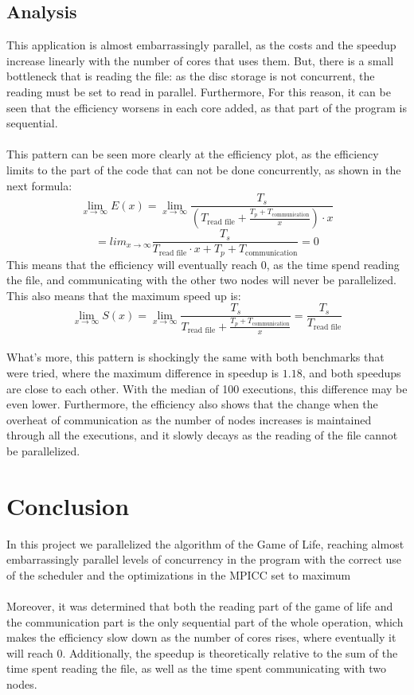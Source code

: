 \documentclass[11pt, a4paper]{article}
\begin{document}
	\subsection{Analysis}
	This application is almost embarrassingly parallel, as the costs and the speedup increase linearly with the number of cores that uses them. But, there is a small bottleneck that is reading the file: as the disc storage is not concurrent, the reading must be set to read in parallel. Furthermore, For this reason, it can be seen that the efficiency worsens in each core added, as that part of the program is sequential.\\
\\
This pattern can be seen more clearly at the efficiency plot, as the efficiency limits to the part of the code that can not be done concurrently, as shown in the next formula:
\[ \lim_{x \to \infty} E(x) = \lim_{x \to \infty} \frac{T_s} {(T_{\text{read file}} +  \frac{T_p + T_\text{communication}} x ) \cdot x} \]
\[= lim_{x \to \infty}\frac{T_s}{T_\text{read file} \cdot x + T_p + T_{\text{communication}}} = 0\]
This means that the efficiency will eventually reach 0, as the time spend reading the file, and communicating with the other two nodes will never be parallelized. This also means that the maximum speed up is:
\[ \lim_{x \to \infty} S(x) = \lim_{x \to \infty} \frac{T_s}{T_{\text{read file}} + \frac{T_p + T_\text{communication}}x} = \frac{T_s}{T_\text{read file}}\]
\\
What's more, this pattern is shockingly the same with both benchmarks that were tried, where the maximum difference in speedup is $1.18$, and both speedups are close to each other. With the median of 100 executions, this difference may be even lower. Furthermore, the efficiency also shows that the change when the overheat of communication as the number of nodes increases is maintained through all the executions, and it slowly decays as the reading of the file cannot be parallelized. 
	\section{Conclusion}
	In this project we parallelized the algorithm of the Game of Life, reaching almost embarrassingly parallel levels of concurrency in the program with the correct use of the scheduler and the optimizations in the MPICC set to maximum\\
\\
Moreover, it was determined that both the reading part of the game of life and the communication part is the only sequential part of the whole operation, which makes the efficiency slow down as the number of cores rises, where eventually it will reach 0. Additionally, the speedup is theoretically relative to the sum of the time spent reading the file, as well as the time spent communicating with two nodes.\\
\\
	
\end{document}

